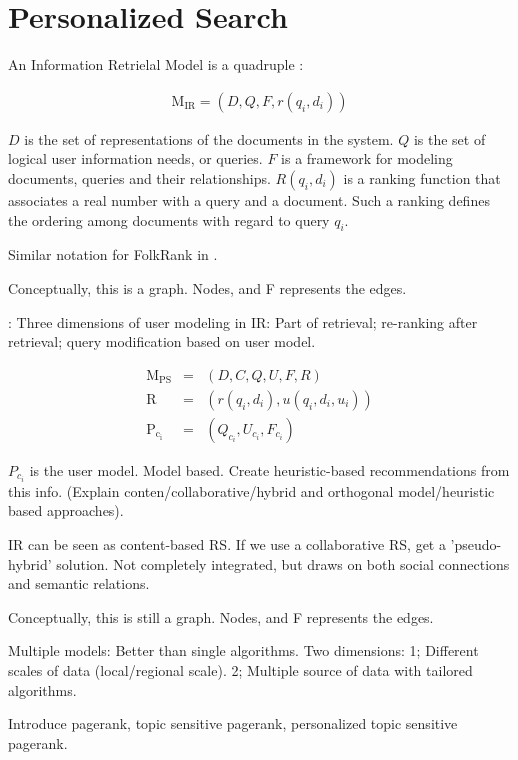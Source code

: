 \section{Personalized Search}

An Information Retrielal Model is a quadruple \citep[p23]{Baeza-Yates1999}:

\begin{eqnarray}
  \mathrm{M_{IR}} = (D, Q, F, r(q_i, d_i))
\end{eqnarray}

$D$ is the set of representations of the documents in the system. $Q$ is the set of logical user information needs, or queries.
$F$ is a framework for modeling documents, queries and their relationships.
$R(q_i, d_i)$ is a ranking function that associates a real number with a query and a document.
Such a ranking defines the ordering among documents with regard to query $q_i$.

Similar notation for FolkRank in \cite[p4]{Hotho}.

Conceptually, this is a graph.
Nodes, and F represents the edges.

\cite[p6]{Micarelli2007}: Three dimensions of user modeling in IR: Part of retrieval; re-ranking after
retrieval; query modification based on user model.

\begin{eqnarray}
  \mathrm{M_{PS}}  &=& (D, C, Q, U, F, R)\\
  \mathrm{R}       &=& (r(q_i, d_i), u(q_i, d_i, u_i))\\
  \mathrm{P_{c_i}} &=& (Q_{c_i}, U_{c_i}, F_{c_i})
\end{eqnarray}

$P_{c_i}$ is the user model. Model based. Create heuristic-based recommendations from this info.
(Explain conten/collaborative/hybrid and orthogonal model/heuristic based approaches).

IR can be seen as content-based RS. 
If we use a collaborative RS, get a 'pseudo-hybrid' solution. Not completely integrated,
but draws on both social connections and semantic relations.

Conceptually, this is still a graph.
Nodes, and F represents the edges.

Multiple models: Better than single algorithms. Two dimensions: 
1; Different scales of data (local/regional scale).
2; Multiple source of data with tailored algorithms.

Introduce pagerank, topic sensitive pagerank, personalized topic sensitive pagerank.

